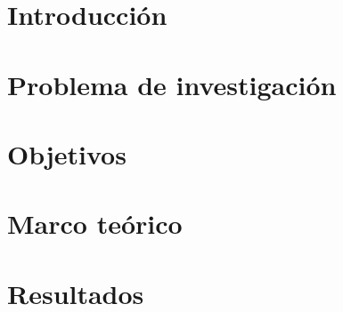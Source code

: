 \documentclass[letterpaper, oneside, openright, 12pt]{book}
\begin{document}
\frontmatter
\setcounter{page}{1}
  
  \clearpage %
  \thispagestyle{empty} %

  
  \clearpage %
  \thispagestyle{empty} %

  \renewcommand*{\thepage}{}

  \tableofcontents
  \cleardoublepage %

\mainmatter
\setcounter{page}{1}
\renewcommand*{\thepage}{\arabic{page}}

  \chapter*{Introducción}
  
  \newpage %

  \chapter{Problema de investigación}
  
  \newpage %

  \chapter{Objetivos}
  
  \newpage %

  \chapter{Marco teórico}
  
  \newpage %

  \chapter{Resultados}
  
  \newpage %
\end{document}
